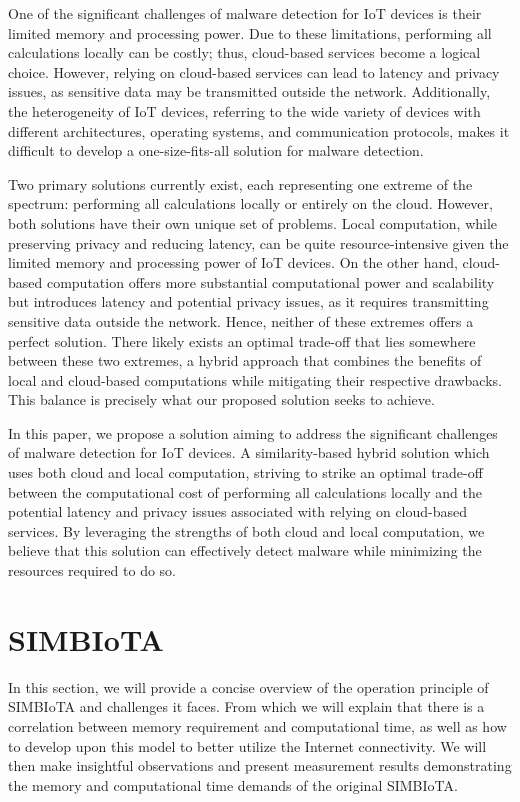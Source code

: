\documentclass[
	a4paper, %
	10pt, %
	unnumberedsections, %
	twoside, %
]{LTJournalArticle}
\begin{document}
One of the significant challenges of malware detection for IoT devices is their limited memory and processing power. Due to these limitations, performing all calculations locally can be costly; thus, cloud-based services become a logical choice. However, relying on cloud-based services can lead to latency and privacy issues, as sensitive data may be transmitted outside the network. Additionally, the heterogeneity of IoT devices, referring to the wide variety of devices with different architectures, operating systems, and communication protocols, makes it difficult to develop a one-size-fits-all solution for malware detection.

Two primary solutions currently exist\autocite{ogsimbiota}\autocite{cloudeyes}, each representing one extreme of the spectrum: performing all calculations locally or entirely on the cloud. However, both solutions have their own unique set of problems. Local computation, while preserving privacy and reducing latency, can be quite resource-intensive given the limited memory and processing power of IoT devices. On the other hand, cloud-based computation offers more substantial computational power and scalability but introduces latency and potential privacy issues, as it requires transmitting sensitive data outside the network. Hence, neither of these extremes offers a perfect solution. There likely exists an optimal trade-off that lies somewhere between these two extremes, a hybrid approach that combines the benefits of local and cloud-based computations while mitigating their respective drawbacks. This balance is precisely what our proposed solution seeks to achieve.


In this paper, we propose a solution aiming to address the significant challenges of malware detection for IoT devices. A similarity-based hybrid solution which uses both cloud and local computation, striving to strike an optimal trade-off between the computational cost of performing all calculations locally and the potential latency and privacy issues associated with relying on cloud-based services. By leveraging the strengths of both cloud and local computation, we believe that this solution can effectively detect malware while minimizing the resources required to do so.



\section{SIMBIoTA}
In this section, we will provide a concise overview of the operation principle of SIMBIoTA and challenges it faces. From which we will explain that there is a correlation between memory requirement and computational time, as well as how to develop upon this model to better utilize the Internet connectivity. We will then make insightful observations and present measurement results demonstrating the memory and computational time demands of the original SIMBIoTA.
\end{document}
